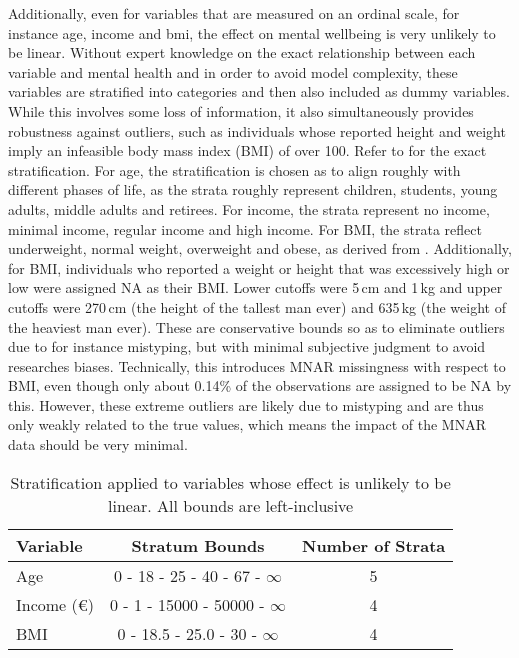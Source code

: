 Additionally, even for variables that are measured on an ordinal scale, for instance age, income and bmi, the effect on mental wellbeing is very unlikely to
be linear. Without expert knowledge on the exact relationship between each variable
and mental health and in order to avoid model complexity, these variables are stratified into categories and then also
included as dummy variables. While this involves some loss of information, it also simultaneously provides robustness
against outliers, such as individuals whose reported height and weight imply an infeasible body mass index (BMI) of over 100.
Refer to  for the exact stratification.
For age, the stratification is chosen as to align roughly with different phases of life, as the strata roughly represent
children, students, young adults, middle adults and retirees.
For income, the strata represent no income, minimal income, regular income and high income.
For BMI, the strata reflect underweight, normal weight, overweight and obese, as derived from .
Additionally, for BMI, individuals who reported a weight or height that was excessively high or low were assigned NA as their BMI.
Lower cutoffs were 5\,cm and 1\,kg and upper cutoffs were 270\,cm (the height of the tallest man ever) and 635\,kg
(the weight of the heaviest man ever). These are conservative bounds so as to eliminate outliers due to for instance
mistyping, but with minimal subjective judgment to avoid researches biases.
Technically, this introduces MNAR missingness with respect to BMI, even though only about 0.14\% of the observations are
assigned to be NA by this. However, these extreme outliers are likely due to mistyping and are thus only weakly related to the
true values, which means the impact of the MNAR data should be very minimal.

\begin{table}[htbp]
    \centering
    \caption{Stratification applied to variables whose effect is unlikely to be linear. All bounds are left-inclusive}
    \label{tab:data:stratification}
    \begin{tabular}{l|c|c}
        Variable & Stratum Bounds & Number of Strata \\
        \hline
        Age        & 0 \hfill- \hfill18 \hfill- \hfill25 \hfill- \hfill40 \hfill- \hfill67 \hfill- \hfill$ \infty$ & 5  \\
        Income (€) & 0 \hfill- \hfill1 \hfill- \hfill15000 \hfill- \hfill50000 \hfill- \hfill$ \infty$ & 4  \\
        BMI        & 0 \hfill- \hfill18.5 \hfill- \hfill25.0 \hfill- \hfill30 \hfill- \hfill$ \infty$  & 4  \\
    \end{tabular}
\end{table}

